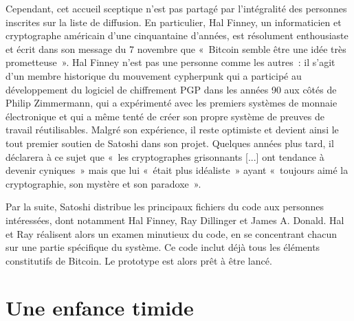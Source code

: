 Cependant, cet accueil sceptique n'est pas partagé par l'intégralité des personnes inscrites sur la liste de diffusion. En particulier, Hal Finney, un informaticien et cryptographe américain d'une cinquantaine d'années, est résolument enthousiaste et écrit dans son message du 7 novembre que «~Bitcoin semble être une idée très prometteuse~». Hal Finney n'est pas une personne comme les autres~: il s'agit d'un membre historique du mouvement cypherpunk qui a participé au développement du logiciel de chiffrement PGP dans les années 90 aux côtés de Philip Zimmermann, qui a expérimenté avec les premiers systèmes de monnaie électronique et qui a même tenté de créer son propre système de preuves de travail réutilisables. Malgré son expérience, il reste optimiste et devient ainsi le tout premier soutien de Satoshi dans son projet. Quelques années plus tard, il déclarera à ce sujet que «~les cryptographes grisonnants [...] ont tendance à devenir cyniques~» mais que lui «~était plus idéaliste~» ayant «~toujours aimé la cryptographie, son mystère et son paradoxe~».

Par la suite, Satoshi distribue les principaux fichiers du code aux personnes intéressées, dont notamment Hal Finney, Ray Dillinger et James A. Donald. Hal et Ray réalisent alors un examen minutieux du code, en se concentrant chacun sur une partie spécifique du système. Ce code inclut déjà tous les éléments constitutifs de Bitcoin. Le prototype est alors prêt à être lancé.

\section*{Une enfance timide}

